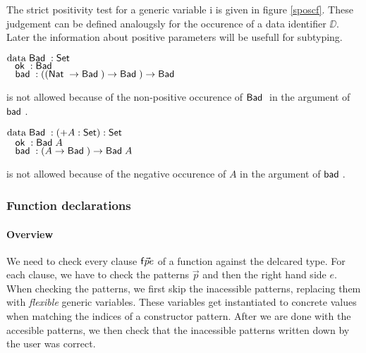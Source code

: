 The strict positivity test for a generic variable i is given in figure \ref{sposcf}.
These judgement can be defined analougsly for the occurence of a data identifier $\DD$.
Later the information about positive parameters will be usefull for subtyping.

\begin{bsp}
$\mathrm{data}\; \mathsf{Bad}\; : \mathsf{Set} $ \\
$\hspace*{3mm} \mathsf{ok}\; : \mathsf{Bad}\;$\\
$\hspace*{3mm} \mathsf{bad}\; : ((\mathsf{Nat}\; \rightarrow \mathsf{Bad}\;) \rightarrow \mathsf{Bad}\;) \rightarrow \mathsf{Bad}\;  $
\end{bsp}
is not allowed because of the non-positive occurence of $\mathsf{Bad}\;$ in the argument of $\mathsf{bad}\;$.

\begin{bsp}
$\mathrm{data}\; \mathsf{Bad}\; : ( + A : \mathsf{Set} ) : \mathsf{Set} $\\
$\hspace*{3mm} \mathsf{ok}\; : \mathsf{Bad}\; A$\\
$\hspace*{3mm} \mathsf{bad}\; : (A \rightarrow \mathsf{Bad}\;) \rightarrow \mathsf{Bad}\; A$
\end{bsp}
is not allowed because of the negative occurence of $A$ in the argument of $\mathsf{bad}\;$.

\subsubsection{Function declarations}

\newcommand\checkcl[2]{#1\mbox{ \textbf{checkcl}}#2}
\newcommand\checkp[5]{(#1)\vdash#2\mbox{ \textbf{checkp} }#3\Rightarrow (#4),#5}
\newcommand\checkps[5]{(#1)\vdash#2\mbox{ \textbf{checkps} }#3\Rightarrow (#4),#5}
\newcommand\checkinacc[2]{(#1)\vdash\mbox{ \textbf{checkinaccs} }#2}
\newcommand\inst[5]{#1,#2\vdash#3\mbox{ \textbf{inst} }#4\Rightarrow #5}
\newcommand\instlist[5]{#1,#2\vdash#3\mbox{ \textbf{instList} }#4\Rightarrow #5}


\paragraph*{Overview}
We need to check every clause $\mathsf{f} \vec{p} e$ of a function against the delcared type.
For each clause, we have to check the patterns $\vec{p}$ and then the right hand side $e$.
When checking the patterns, we first skip the inacessible patterns, 
replacing them with \emph{flexible} generic variables.
These variables get instantiated to concrete values when matching
the indices of a constructor pattern.
After we are done with the accesible patterns, 
we then check that the inacessible patterns written down 
by the user was correct.
\newcommand{\subst}[2]{#1\{#2\}}
\newcommand{\substClos}[2]{#1\{#2\}}
\newcommand{\substEnv}[2]{#1\{#2\}}
\newcommand{\compS}[2]{\mathrm{compS}#1\;#2}


